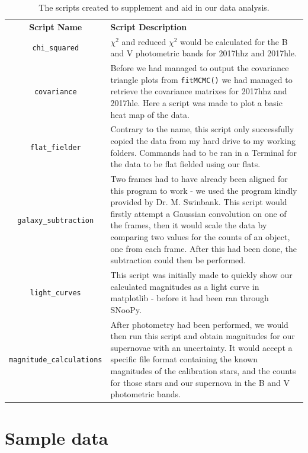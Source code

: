 \documentclass[twocolumn]{revtex4}
\begin{document}
{\renewcommand{\arraystretch}{1.5}%
\begin{table}[h!]
\centering    
\begin{tabularx}{\textwidth}{c@{\hskip 20pt}X}
    \hline
    \textbf{Script Name} & \textbf{Script Description} \\ 
     \texttt{chi\_squared} & $\chi^2$ and reduced $\chi^2$ would be calculated for the B and V photometric bands for 2017hhz and 2017hle. \\
     \texttt{covariance} & Before we had managed to output the covariance triangle plots from \texttt{fitMCMC()} we had managed to retrieve the covariance matrixes for 2017hhz and 2017hle. Here a script was made to plot a basic heat map of the data. \\
     \texttt{flat\_fielder} & Contrary to the name, this script only successfully copied the data from my hard drive to my working folders. Commands had to be ran in a Terminal for the data to be flat fielded using our flats. \\
     \texttt{galaxy\_subtraction} & Two frames had to have already been aligned for this program to work - we used the program kindly provided by Dr. M. Swinbank. This script would firstly attempt a Gaussian convolution on one of the frames, then it would scale the data by comparing two values for the counts of an object, one from each frame. After this had been done, the subtraction could then be performed. \\
     \texttt{light\_curves} & This script was initially made to quickly show our calculated magnitudes as a light curve in matplotlib - before it had been ran through SNooPy. \\
     \texttt{magnitude\_calculations} & After photometry had been performed, we would then run this script and obtain magnitudes for our supernovae with an uncertainty. It would accept a specific file format containing the known magnitudes of the calibration stars, and the counts for those stars and our supernova in the B and V photometric bands. \\
    \hline      
\end{tabularx}
\caption{The scripts created to supplement and aid in our data analysis. }
\label{table:programs}
\end{table}

\vspace{-3ex}
\section{Sample data}
\vspace{-3ex}
}
\end{document}
